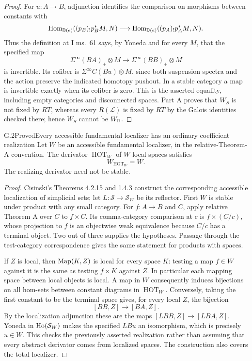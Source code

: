 \begin{proof}
For $u:A\to B$, adjunction identifies the comparison on morphisms between constants with
\[
 \operatorname{Hom}_{\mathbb D(e)}((p_B)_!p_B^*M,N)
 \longrightarrow
 \operatorname{Hom}_{\mathbb D(e)}((p_A)_!p_A^*M,N).
\]
Thus the definition at I ms.~61 says, by Yoneda and for every $M$, that the specified map
\[
 \Sigma^\infty(BA)_+\otimes M
 \longrightarrow\Sigma^\infty(BB)_+\otimes M
\]
is invertible. Its cofiber is $\Sigma^\infty C(Bu)\otimes M$, since both suspension spectra and the action preserve the indicated homotopy pushout. In a stable category a map is invertible exactly when its cofiber is zero. This is the asserted equality, including empty categories and disconnected spaces. Part A proves that $W_S$ is not fixed by $RT$, whereas every $R(\mathcal L)$ is fixed by $RT$ by the Galois identities checked there; hence $W_S$ cannot be $W_{\mathbb D}$.
\end{proof}

\begin{claim}{G.2}{Proved}{Every accessible fundamental localizer has an ordinary coefficient realization}
Let $W$ be an accessible fundamental localizer, in the relative-Theorem-A convention. The derivator $\operatorname{HOT}_W$ of $W$-local spaces satisfies
\[
 W_{\operatorname{HOT}_W}=W.
\]
The realizing derivator need not be stable.
\end{claim}
\begin{proof}
Cisinski's Theorems 4.2.15 and 1.4.3 construct the corresponding accessible localization of simplicial sets; let $L:\mathcal S\to\mathcal S_W$ be its reflector. First $W$ is stable under product with any small category. For $f:A\to B$ and $C$, apply relative Theorem A over $C$ to $f\times C$. Its comma-category comparison at $c$ is $f\times(C/c)$, whose projection to $f$ is an objectwise weak equivalence because $C/c$ has a terminal object. Two out of three supplies the hypotheses. Passage through the test-category correspondence gives the same statement for products with spaces.

If $Z$ is local, then $\operatorname{Map}(K,Z)$ is local for every space $K$: testing a map $f\in W$ against it is the same as testing $f\times K$ against $Z$. In particular each mapping space between local objects is local. A map in $W$ consequently induces bijections on all hom-sets between constant diagrams in $\operatorname{HOT}_W$. Conversely, taking the first constant to be the terminal space gives, for every local $Z$, the bijection
\[
 [BB,Z]\longrightarrow[BA,Z].
\]
By the localization adjunction these are the maps $[LBB,Z]\to[LBA,Z]$. Yoneda in $\operatorname{Ho}(\mathcal S_W)$ makes the specified $LBu$ an isomorphism, which is precisely $u\in W$. This checks the previously asserted realization rather than assuming that every abstract derivator comes from localized spaces. The construction also covers the total localizer.
\end{proof}

